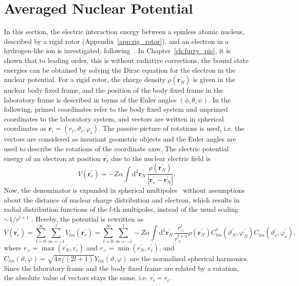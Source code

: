 \section{Averaged Nuclear Potential}
In this section, the electric interaction energy between a spinless atomic nucleus, described by a rigid rotor (Appendix~\ref{app:rig_rotor}), and an electron in a hydrogen-like ion is investigated, following~\cite{kozhedub2008,jacek2012}. In Chapter~\ref{ch:furry_pic}, it is shown that to leading order, this is without radiative corrections, the bound state energies can be obtained by solving the Dirac equation for the electron in the nuclear potential. For a rigid rotor, the charge density $\rho(\mathbf{r}^{\prime}_N)$ is given in the nuclear body fixed frame, and the position of the body fixed frame in the laboratory frame is described in terms of the Euler angles $(\phi,\theta,\psi)$. In the following, primed coordinates refer to the body fixed system and unprimed coordinates to the laboratory system, and vectors are written in spherical coordinates as $\mathbf{r}_i=(r_i,\vartheta_i,\varphi_i)$. The passive picture of rotations is used, i.e. the vectors are considered as invariant geometric objects and the Euler angles are used to describe the rotations of the coordinate axes. The electric potential energy of an electron at position $\mathbf{r}_{e}^\prime$ due to the nuclear electric field is
\begin{equation}
V(\mathbf{r}_e^\prime)=-Z\alpha \int\mathrm{d}^3\mathbf{r}_N^\prime\,
\frac{\rho(\mathbf{r}_N^\prime)}{\left|\mathbf{r}_e^\prime - \mathbf{r}_N^\prime\right|}.
\end{equation}
Now, the denominator is expanded in spherical multipoles~\cite{jackson1999} without assumptions about the distance of nuclear charge distribution and electron, which results in radial distribution functions of the $l$-th multipoles, instead of the usual scaling $\sim 1/r^{l+1}$ . Hereby, the potential is rewritten as
\begin{equation}
V(\mathbf{r}_e^\prime)=\sum_{l=0}^\infty \sum_{m=-l}^l V_{lm}(\mathbf{r}_e^\prime)= \sum_{l=0}^\infty \sum_{m=-l}^l
-Z\alpha\int\mathrm{d}^3\mathbf{r}_N^{\prime}\,\frac{r_<^l}{r_>^{l+1}}\rho(\mathbf{r}_N^\prime) C_{lm}^*(\vartheta^\prime_N,\varphi_N^\prime) C_{lm}(\vartheta^\prime_e,\varphi_e^\prime),
\label{eq:mulitipoles_1}
\end{equation}
where $r_>=\max(r^\prime_N,r^\prime_e)$ and $r_<=\min(r^\prime_N,r^\prime_e)$, and $C_{lm}(\vartheta,\varphi)=\sqrt{4\pi/(2l+1)}Y_{lm}(\vartheta,\varphi)$ are the normalized spherical harmonics. Since the laboratory frame and the body fixed frame are related by a rotation, the absolute value of vectors stays the same, i.e. $r^\prime_i = r_i$.
